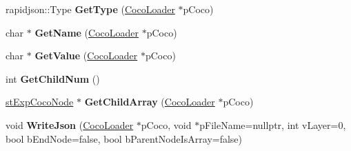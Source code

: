 \begin{DoxyCompactItemize}
\item 
\mbox{\label{structcocostudio_1_1stExpCocoNode_aaa740358f7823aedb0d8bf72ea242e6a}} 
rapidjson\+::\+Type {\bfseries Get\+Type} (\hyperlink{classcocostudio_1_1CocoLoader}{Coco\+Loader} $\ast$p\+Coco)
\item 
\mbox{\label{structcocostudio_1_1stExpCocoNode_a82ad8b720041af55cd7c145db930cece}} 
char $\ast$ {\bfseries Get\+Name} (\hyperlink{classcocostudio_1_1CocoLoader}{Coco\+Loader} $\ast$p\+Coco)
\item 
\mbox{\label{structcocostudio_1_1stExpCocoNode_a4519d6cf345df86d03facba8cbc9fe17}} 
char $\ast$ {\bfseries Get\+Value} (\hyperlink{classcocostudio_1_1CocoLoader}{Coco\+Loader} $\ast$p\+Coco)
\item 
\mbox{\label{structcocostudio_1_1stExpCocoNode_a0337623bc8e1679b04f1a206018ae9af}} 
int {\bfseries Get\+Child\+Num} ()
\item 
\mbox{\label{structcocostudio_1_1stExpCocoNode_a172e169883bcb00eeebacfffead85d23}} 
\hyperlink{structcocostudio_1_1stExpCocoNode}{st\+Exp\+Coco\+Node} $\ast$ {\bfseries Get\+Child\+Array} (\hyperlink{classcocostudio_1_1CocoLoader}{Coco\+Loader} $\ast$p\+Coco)
\item 
\mbox{\label{structcocostudio_1_1stExpCocoNode_ab970af470e5689808955f3392a34cbe7}} 
void {\bfseries Write\+Json} (\hyperlink{classcocostudio_1_1CocoLoader}{Coco\+Loader} $\ast$p\+Coco, void $\ast$p\+File\+Name=nullptr, int v\+Layer=0, bool b\+End\+Node=false, bool b\+Parent\+Node\+Is\+Array=false)
\end{DoxyCompactItemize}
